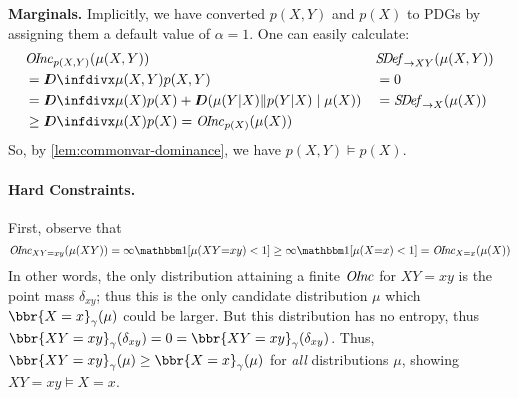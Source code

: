 \begin{subappendices}
    \begin{lproof}\label{proof:entailment}
    \textbf{Marginals.}
       Implicitly, we have converted $p(X,Y)$ and $p(X)$ to PDGs 
        by assigning them a default value of $\alpha=1$. 
    One can easily calculate:
    \begin{align*}
    &\OInc_{p(X,Y)}(\mu(X,Y))
            &  &\SDef_{\to XY}(\mu(X,Y)) 
            \\
    &= \kldiv{\mu(X,Y)}{p(X,Y)} 
            & &= 0
            \\
    &= \kldiv{\mu(X)}{p(X)} + \thickD( \mu(Y|X) \Vert p(Y|X) \mid \mu(X))
            & &= \SDef_{ \to X }(\mu(X))\\
    &\ge \kldiv{\mu(X)}{p(X)} = \OInc_{p(X)}(\mu(X))
    \end{align*} 
    So, by \cref{lem:commonvar-dominance}, we have $p(X,Y) \models p(X)$.


    \paragraph{ Hard Constraints.}
    First, observe that
     \[
        \OInc_{XY{=}xy}(\mu(XY)) = \infty \mathbbm1[\mu(XY{=}xy) < 1]
        \ge
        \infty \mathbbm1[\mu(X{=}x) < 1] = \OInc_{X{=}x}(\mu(X))
    \]
    In other words, the only distribution attaining a finite $\mathit{O\mskip-2.5muI\mskip-3.5mun\mskip-1.7muc}$
    for $XY = xy$ is the point mass $\delta_{xy}$; thus this
    is the only candidate distribution $\mu$ which 
    $\bbr{X=x}_\gamma(\mu)$ could be larger. But this distribution
    has no entropy, thus $\bbr{XY=xy}_\gamma(\delta_{xy}) = 0 
        = \bbr{XY=xy}_\gamma(\delta_{xy})$. 
    Thus, 
        $\bbr{XY=xy}_\gamma(\mu) \ge \bbr{X=x}_\gamma(\mu)$ for \emph{all}
        distributions $\mu$, showing $XY=xy \models X=x$. 




\end{lproof}
\end{subappendices}
